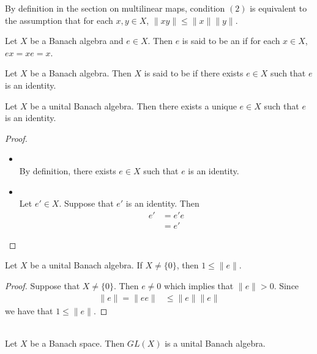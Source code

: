 \documentclass{book}
\begin{document}
\begin{note}
	By definition in the section on multilinear maps, condition $(2)$ is equivalent to the assumption that for each $x,y \in X$, $\|xy\| \leq \|x\|\|y\|$.
\end{note}

\begin{defn} \ld{}
	Let $X$ be a Banach algebra and $e \in X$. Then $e$ is said to be an  if for each $x \in X$, $ex = xe = x$. 
\end{defn}


\begin{defn} \ld{}
	Let $X$ be a Banach algebra. Then $X$ is said to be  if there exists $e \in X$ such that $e$ is an identity.
\end{defn}	

\begin{ex} \lex{}
	Let $X$ be a unital Banach algebra. Then there exists a unique $e \in X$ such that $e$ is an identity.
\end{ex} 

\begin{proof}\
	\begin{itemize}
		\item {} \\
		By definition, there exists $e \in X$ such that $e$ is an identity.
		\item {}\\
		Let $e' \in X$. Suppose that $e'$ is an identity. Then 
		\begin{align*}
			e' 
			& = e' e \\
			& = e'
		\end{align*}	
	\end{itemize}
\end{proof}

\begin{ex} \lex{}
	Let $X$ be a unital Banach algebra. If $X \neq \{0\}$, then $1 \leq \|e \|$. 
\end{ex}

\begin{proof}
	Suppose that $X \neq \{0\}$. Then $e \neq 0$ which implies that $\|e \| > 0$. Since 
	\begin{align*}
		\|e \|
		= \|e e \|
		& \leq \|e \|\|e \|
	\end{align*}
	we have that $1 \leq \|e \|$.
\end{proof}

\begin{ex} \lex{} \\
	Let $X$ be a Banach space. Then $GL(X)$ is a unital Banach algebra.
\end{ex}
\end{document}

